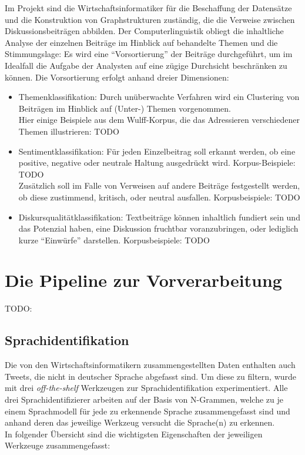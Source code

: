 \documentclass[11pt]{article}
\begin{document}
Im Projekt sind die Wirtschaftsinformatiker für die Beschaffung der
Datensätze und die Konstruktion von Graphstrukturen zuständig, die die
Verweise zwischen Diskussionsbeiträgen abbilden. Der
Computerlinguistik obliegt die inhaltliche Analyse der einzelnen
Beiträge im Hinblick auf behandelte Themen und die Stimmungslage: Es
wird eine ``Vorsortierung'' der Beiträge durchgeführt, um im Idealfall
die Aufgabe der Analysten auf eine zügige Durchsicht beschränken zu
können. Die Vorsortierung erfolgt anhand dreier Dimensionen:
\begin{itemize}
\item Themenklassifikation: Durch unüberwachte Verfahren wird ein
  Clustering von Beiträgen im Hinblick auf (Unter-) Themen
  vorgenommen.\\ Hier einige Beispiele aus dem Wulff-Korpus, die das
  Adressieren verschiedener Themen illustrieren: TODO
\item Sentimentklassifikation: Für jeden Einzelbeitrag soll erkannt
  werden, ob eine positive, negative oder neutrale Haltung ausgedrückt
  wird. Korpus-Beispiele: TODO\\ Zusätzlich soll im Falle von Verweisen auf andere Beiträge
  festgestellt werden, ob diese zustimmend, kritisch, oder neutral
  ausfallen. Korpusbeispiele: TODO
\item Diskursqualitätklassifikation: Textbeiträge können inhaltlich
  fundiert sein und das Potenzial haben, eine Diskussion fruchtbar
  voranzubringen, oder lediglich kurze ``Einwürfe''
  darstellen. Korpusbeispiele: TODO
\end{itemize}


\section{Die Pipeline zur Vorverarbeitung}

TODO:
\subsection{Sprachidentifikation}

Die von den Wirtschaftsinformatikern zusammengestellten Daten
enthalten auch Tweets, die nicht in deutscher Sprache abgefasst
sind. Um diese zu filtern, wurde mit drei {\em off-the-shelf} Werkzeugen zur Sprachidentifikation
experimentiert. Alle drei Sprachidentifizierer arbeiten auf der Basis von N-Grammen, welche zu je
einem Sprachmodell für jede zu erkennende Sprache zusammengefasst sind und anhand deren das jeweilige Werkzeug versucht die Sprache(n) zu erkennen. \\ 
In folgender Übersicht sind die wichtigsten Eigenschaften der jeweiligen Werkzeuge zusammengefasst:  \\
\end{document}
